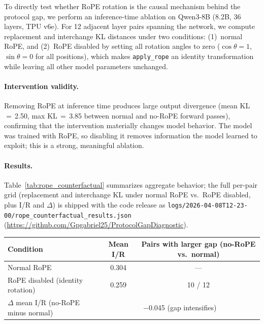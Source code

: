 \documentclass{article}
\newenvironment{tabhere}{%
  \par\medskip
  \begin{center}
}{%
  \end{center}
  \medskip
}
\begin{document}
To directly test whether RoPE rotation is the causal mechanism behind the protocol gap, we perform an inference-time ablation on Qwen3-8B (8.2B, 36 layers, TPU v6e). For 12 adjacent layer pairs spanning the network, we compute replacement and interchange KL distances under two conditions: (1)~normal RoPE, and (2)~RoPE disabled by setting all rotation angles to zero ($\cos\theta = 1$, $\sin\theta = 0$ for all positions), which makes \texttt{apply\_rope} an identity transformation while leaving all other model parameters unchanged.

\paragraph{Intervention validity.} Removing RoPE at inference time produces large output divergence (mean KL\,$=$\,2.50, max KL\,$=$\,3.85 between normal and no-RoPE forward passes), confirming that the intervention materially changes model behavior. The model was trained with RoPE, so disabling it removes information the model learned to exploit; this is a strong, meaningful ablation.

\paragraph{Results.} Table~\ref{tab:rope_counterfactual} summarizes aggregate behavior; the full per-pair grid (replacement and interchange KL under normal RoPE vs.\ RoPE disabled, plus I/R and $\Delta$) is shipped with the code release as \texttt{logs/2026-04-08T12-23-00/rope\_counterfactual\_results.json} (\url{https://github.com/Gpgabriel25/ProtocolGapDiagnostic}).

\begin{tabhere}
\centering
\begin{tabular}{@{}lcc@{}}
\toprule
Condition & Mean I/R & Pairs with larger gap (no-RoPE vs.\ normal) \\
\midrule
Normal RoPE & 0.304 & --- \\
RoPE disabled (identity rotation) & 0.259 & 10 / 12 \\
\midrule
$\Delta$ mean I/R (no-RoPE minus normal) & \multicolumn{2}{c}{$-$0.045 (gap intensifies)} \\
\bottomrule
\end{tabular}
\label{tab:rope_counterfactual}
\end{tabhere}
\end{document}
